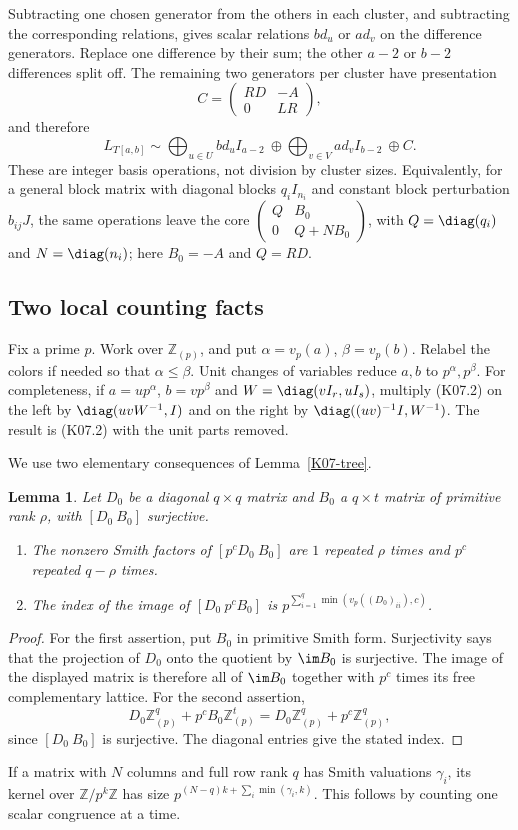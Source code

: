 \documentclass[11pt,a4paper]{article}
\newtheorem{lemma}[theorem]{Lemma}
\theoremstyle{definition}\newtheorem{definition}[theorem]{Definition}
\theoremstyle{remark}\newtheorem{remark}[theorem]{Remark}
\newcommand{\Z}{\mathbb Z}\newcommand{\Q}{\mathbb Q}\newcommand{\F}{\mathbb F}
\numberwithin{equation}{section}
\begin{document}
Subtracting one chosen generator from the others in each cluster, and subtracting the corresponding relations, gives scalar relations $bd_u$ or $ad_v$ on the difference generators. Replace one difference by their sum; the other $a-2$ or $b-2$ differences split off. The remaining two generators per cluster have presentation
\[
 C=\begin{pmatrix}RD&-A\\0&LR\end{pmatrix},                 \tag{K07.2}
\]
and therefore
\[
 L_{T[a,b]}\sim
 \bigoplus_{u\in U}bd_u I_{a-2}\ \oplus
 \bigoplus_{v\in V}ad_v I_{b-2}\ \oplus C.                  \tag{K07.3}
\]
These are integer basis operations, not division by cluster sizes. Equivalently, for a general block matrix with diagonal blocks $q_iI_{n_i}$ and constant block perturbation $b_{ij}J$, the same operations leave the core $\left(\begin{smallmatrix}Q&B_0\\0&Q+N B_0\end{smallmatrix}\right)$, with $Q=\diag(q_i)$ and $N=\diag(n_i)$; here $B_0=-A$ and $Q=RD$.

\subsection{Two local counting facts}\label{K07-sec-3}
Fix a prime $p$. Work over $\Z_{(p)}$, and put $\alpha=v_p(a)$, $\beta=v_p(b)$. Relabel the colors if needed so that $\alpha\leq\beta$. Unit changes of variables reduce $a,b$ to $p^\alpha,p^\beta$. For completeness, if $a=up^\alpha$, $b=vp^\beta$ and $W=\diag(vI_r,uI_s)$, multiply (K07.2) on the left by $\diag(uvW^{-1},I)$ and on the right by $\diag((uv)^{-1}I,W^{-1})$. The result is (K07.2) with the unit parts removed.

We use two elementary consequences of Lemma~\ref{K07-tree}.
\begin{lemma}\label{K07-count}
Let $D_0$ be a diagonal $q\times q$ matrix and $B_0$ a $q\times t$ matrix of primitive rank $\rho$, with $[D_0\ B_0]$ surjective.
\begin{enumerate}
\item The nonzero Smith factors of $[p^cD_0\ B_0]$ are $1$ repeated $\rho$ times and $p^c$ repeated $q-\rho$ times.
\item The index of the image of $[D_0\ p^cB_0]$ is
$p^{\sum_{i=1}^q\min(v_p((D_0)_{ii}),c)}$.
\end{enumerate}
\end{lemma}
\begin{proof}
For the first assertion, put $B_0$ in primitive Smith form. Surjectivity says that the projection of $D_0$ onto the quotient by $\im B_0$ is surjective. The image of the displayed matrix is therefore all of $\im B_0$ together with $p^c$ times its free complementary lattice. For the second assertion,
\[
 D_0\Z_{(p)}^q+p^cB_0\Z_{(p)}^t
 =D_0\Z_{(p)}^q+p^c\Z_{(p)}^q,
\]
since $[D_0\ B_0]$ is surjective. The diagonal entries give the stated index.
\end{proof}
If a matrix with $N$ columns and full row rank $q$ has Smith valuations $\gamma_i$, its kernel over $\Z/p^k\Z$ has size $p^{(N-q)k+\sum_i\min(\gamma_i,k)}$. This follows by counting one scalar congruence at a time.
\end{document}
